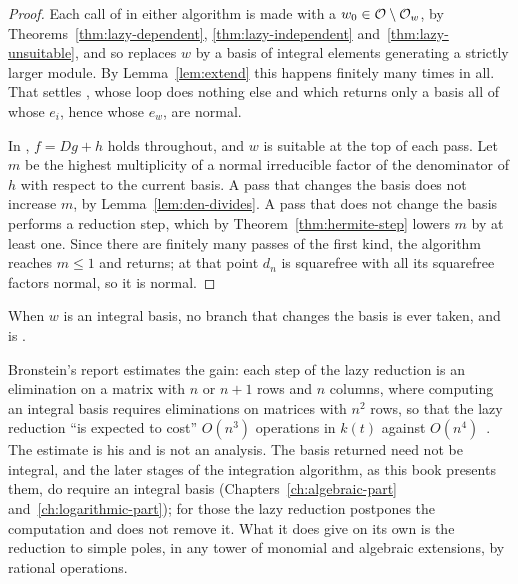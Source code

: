 \begin{proof}
Each call of  in either algorithm is made with a $w_0 \in
\mathcal{O} \setminus \mathcal{O}_w$, by Theorems~\ref{thm:lazy-dependent},
\ref{thm:lazy-independent} and~\ref{thm:lazy-unsuitable}, and so replaces $w$
by a basis of integral elements generating a strictly larger module. By
Lemma~\ref{lem:extend} this happens finitely many times in all. That settles
, whose loop does nothing else and which returns only a
basis all of whose $e_i$, hence whose $e_w$, are normal.

In , $f = Dg + h$ holds throughout, and $w$ is
suitable at the top of each pass. Let $m$ be the highest multiplicity of a normal irreducible factor
of the denominator of $h$ with respect to the current basis. A
pass that changes the basis does not increase $m$, by
Lemma~\ref{lem:den-divides}. A pass that does not change the basis performs a
reduction step, which by Theorem~\ref{thm:hermite-step} lowers $m$ by at
least one. Since there are finitely many passes of the first kind, the
algorithm reaches $m \le 1$ and returns; at that point $d_n$ is squarefree
with all its squarefree factors normal, so it is normal.
\end{proof}

When $w$ is an integral basis, no branch that changes the basis is ever
taken, and  is .

Bronstein's report estimates the gain: each step of the lazy reduction is an
elimination on a matrix with $n$ or $n + 1$ rows and $n$ columns, where
computing an integral basis requires eliminations on matrices with $n^2$ rows,
so that the lazy reduction ``is expected to cost'' $O(n^3)$ operations in
$k(t)$ against $O(n^4)$~\cite[Conclusions]{bronstein1998lazy}. The estimate is
his and is not an analysis. The basis returned need not be integral, and the
later stages of the integration algorithm, as this book presents them, do
require an integral basis (Chapters~\ref{ch:algebraic-part}
and~\ref{ch:logarithmic-part}); for those the lazy reduction postpones the
computation and does not remove it. What it does give on its own is the
reduction to simple poles, in any tower of monomial and algebraic extensions,
by rational operations.

